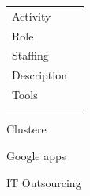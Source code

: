\documentclass[english,a4paper,11pt]{article}
\begin{document}
\begin{tabular}{@{}LR}
Activity & \\
Role & \\
Staffing & \\
Description &  \\
Tools & \\
\addlinespace \bottomrule[.1pt] \addlinespace
\end{tabular}


Clustere

Google apps

IT Outsourcing




%
%
%
%   
%
%
%
%
%
%
\end{document}
